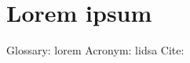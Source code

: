 \chapter{Lorem ipsum}

\lipsum[1]

Glossary: \gls{lorem} Acronym: \acrshort{lidsa} Cite: \cite{Lorem}
